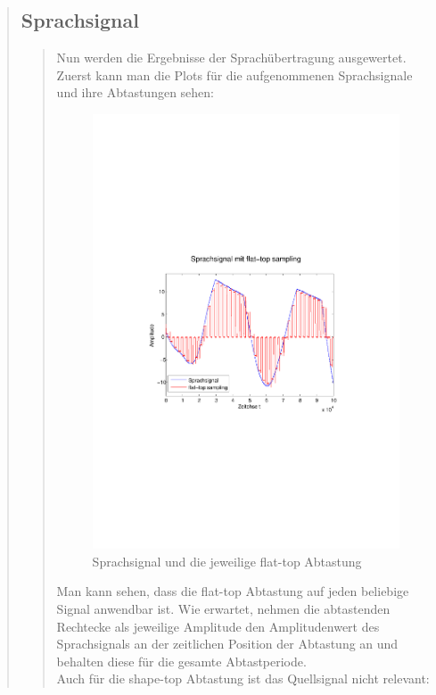 \begin{quote}
       	\subsection{Sprachsignal}
        \begin{quote}
            Nun werden die Ergebnisse der Sprachübertragung ausgewertet. Zuerst kann
            man die Plots für die aufgenommenen Sprachsignale und ihre Abtastungen
            sehen:
            
            \begin{figure}[H]
            \centering
            \includegraphics[scale=0.6, trim = 3.5cm 9cm 4cm 9cm,
            clip]{./Bilder/sprache_flat-top}
                \caption{Sprachsignal und die jeweilige flat-top Abtastung}
            \end{figure}
            
            Man kann sehen, dass die flat-top Abtastung auf jeden beliebige Signal
            anwendbar ist. Wie erwartet, nehmen die abtastenden Rechtecke als
            jeweilige Amplitude den Amplitudenwert des Sprachsignals an der
            zeitlichen Position der Abtastung an und behalten diese für die gesamte
            Abtastperiode.\\
            Auch für die shape-top Abtastung ist das Quellsignal nicht relevant:
            

\end{quote}
\end{quote}
